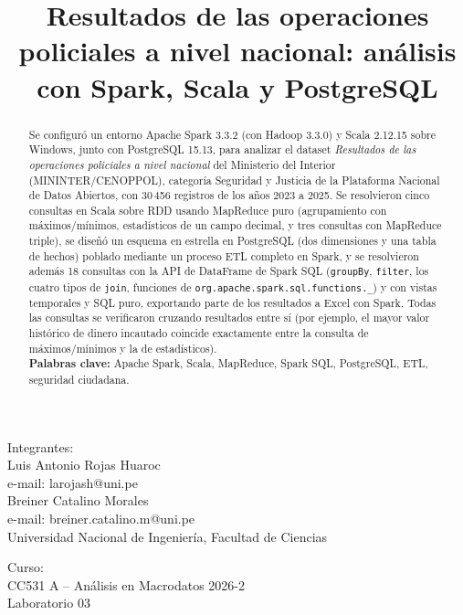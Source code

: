 \documentclass[10pt,a4paper]{article}
\theoremstyle{definition}
\begin{document}
\title{Resultados de las operaciones policiales a nivel nacional: an\'alisis con Spark, Scala y PostgreSQL}
\date{}
\maketitle

\begin{center}
	Integrantes:\\
	\vspace{5pt}
	{\large Luis Antonio Rojas Huaroc}\\
	e-mail: larojash@uni.pe\\
	\vspace{5pt}
	{\large Breiner Catalino Morales}\\
	e-mail: breiner.catalino.m@uni.pe\\
	\vspace{5pt}
	Universidad Nacional de Ingenier\'ia, Facultad de Ciencias
\end{center}
\vspace{5pt}
\begin{center}
	Curso:\\
	\vspace{5pt}
	{\large CC531 A -- An\'alisis en Macrodatos 2026-2}\\
	{\large Laboratorio 03}\\
\end{center}
\vspace{20pt}

\begin{abstract}
{\small
\hspace*{0.5cm}
Se configur\'o un entorno Apache Spark 3.3.2 (con Hadoop 3.3.0) y Scala 2.12.15 sobre Windows, junto
con PostgreSQL 15.13, para analizar el dataset \emph{Resultados de las operaciones policiales a nivel
nacional} del Ministerio del Interior (MININTER/CENOPPOL), categor\'ia Seguridad y Justicia de la
Plataforma Nacional de Datos Abiertos, con 30\,456 registros de los a\~nos 2023 a 2025. Se resolvieron
cinco consultas en Scala sobre RDD usando MapReduce puro (agrupamiento con m\'aximos/m\'inimos,
estad\'isticos de un campo decimal, y tres consultas con MapReduce triple), se dise\~n\'o un esquema en
estrella en PostgreSQL (dos dimensiones y una tabla de hechos) poblado mediante un proceso ETL completo
en Spark, y se resolvieron adem\'as 18 consultas con la API de DataFrame de Spark SQL (\texttt{groupBy},
\texttt{filter}, los cuatro tipos de \texttt{join}, funciones de
\texttt{org.apache.spark.sql.functions.\_}) y con vistas temporales y SQL puro, exportando parte de los
resultados a Excel con Spark. Todas las consultas se verificaron cruzando resultados entre s\'i (por
ejemplo, el mayor valor hist\'orico de dinero incautado coincide exactamente entre la consulta de
m\'aximos/m\'inimos y la de estad\'isticos).\\

\textbf{Palabras clave:} Apache Spark, Scala, MapReduce, Spark SQL, PostgreSQL, ETL, seguridad
ciudadana.
}
\end{abstract}
\end{document}
